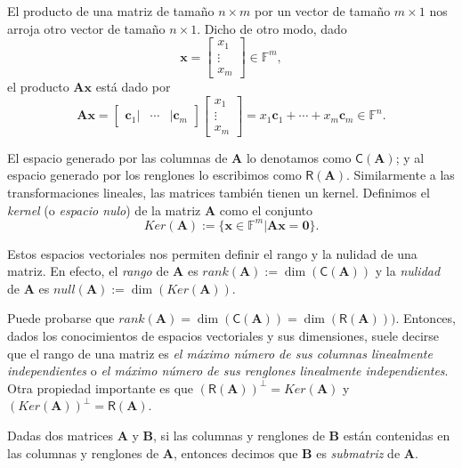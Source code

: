             
            El producto de una matriz de tamaño $n \times m$ por un vector de tamaño $m \times 1$ nos arroja otro vector de tamaño $n \times 1$. Dicho de otro modo, dado  $$\mathbf{x} = \begin{bmatrix}
            x_{1} \\
            \vdots \\
            x_{m}
            \end{bmatrix} \in \mathbb{F}^{m},$$ el producto $\mathbf{Ax}$ está dado por $$ \mathbf{Ax} =  \begin{bmatrix}
            \mathbf{c}_{1} | & \cdots & |\mathbf{c}_{m}
            \end{bmatrix} \begin{bmatrix}
            x_{1} \\
            \vdots\\
            x_{m}
            \end{bmatrix} = x_{1}\mathbf{c}_{1} + \cdots + x_{m}\mathbf{c}_{m} \in \mathbb{F}^{n}.
            $$
            
            El espacio generado por las columnas de $\mathbf{A}$ lo denotamos como $\mathsf{C}(\mathbf{A})$; y al espacio generado por los renglones lo escribimos como $\mathsf{R}(\mathbf{A})$. Similarmente a las transformaciones lineales, las matrices también tienen un kernel. Definimos el \textit{kernel} (o \textit{espacio nulo}) de la matriz $\mathbf{A}$ como el conjunto $$Ker(\mathbf{A}) := \{\mathbf{x} \in \mathbb{F}^{m} | \mathbf{Ax} = \mathbf{0}\}.
            $$
            
            Estos espacios vectoriales nos permiten definir el rango y la nulidad de una matriz. En efecto, el \textit{rango} de $\mathbf{A}$ es $rank(\mathbf{A}):= \dim(\mathsf{C}(\mathbf{A}))$ y la \textit{nulidad} de $\mathbf{A}$ es $null(\mathbf{A}):= \dim(Ker(\mathbf{A}))$.
            
            Puede probarse que $rank(\mathbf{A})= \dim(\mathsf{C}(\mathbf{A})) = \dim(\mathsf{R}(\mathbf{A})))$. Entonces, dados los conocimientos de espacios vectoriales y sus dimensiones, suele decirse que el rango de una matriz es \textit{el máximo número de sus columnas linealmente independientes} o \textit{el máximo número de sus renglones linealmente independientes}. Otra propiedad importante es  que $(\mathsf{R}(\mathbf{A}))^{\perp} = Ker(\mathbf{A})$ y $(Ker(\mathbf{A}))^{\perp} = \mathsf{R}(\mathbf{A})$.
            
            Dadas dos matrices $\mathbf{A}$ y $\mathbf{B}$, si las columnas y renglones de $\mathbf{B}$ están contenidas en las columnas y renglones de $\mathbf{A}$, entonces decimos que $\mathbf{B}$ es \textit{submatriz} de $\mathbf{A}$. 
            
